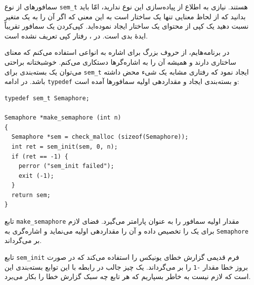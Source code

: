 \documentclass{book}
\begin{document}
    سمافورهای   از نوع {\tt sem\_t} هستند. نیازی به اطلاع از پیاده‌سازی این نوع ندارید، امّا باید بدانید که از لحاظ معنایی 
    تنها یک ساختار است به این معنی که اگر آن را به یک متغیر نسبت دهید یک کپی از محتوای یک ساختار ایجاد نموده‌اید. 
    کپی‌کردن یک سمافور تقریباً ایدهٔ بدی است. در ، رفتار کپی تعریف نشده است. 


    در برنامه‌هایم، از حروف بزرگ برای اشاره به انواعی  استفاده می‌کنم که معنای ساختاری دارند و همیشه آن را به اشاره‌گرها دستکاری می‌کنم. 
    خوشبختانه براحتی می‌توان یک بسته‌بندی برای  {\tt sem\_t} ایجاد نمود که رفتاری مشابه یک شیء‌ محض داشته باشد. 
    در ادامه {\tt typedef}  و بسته‌بندی ایجاد و مقداردهی اولیه سمافورها آمده است: 

\begin{latin}
\begin{lstlisting}
typedef sem_t Semaphore;

Semaphore *make_semaphore (int n)
{
  Semaphore *sem = check_malloc (sizeof(Semaphore));
  int ret = sem_init(sem, 0, n);
  if (ret == -1) {
    perror ("sem_init failed");
    exit (-1);    
  }
  return sem;
}
\end{lstlisting}
\end{latin}

    تابع {\tt make\_semaphore} مقدار اولیه سمافور را به عنوان پارامتر می‌گیرد. فضای لازم برای یک  را تخصیص داده و آن را 
    مقداردهی اولیه می‌نماید و اشاره‌گری به {\tt Semaphore} بر می‌گرداند. 

    تابع {\tt sem\_init} فرم قدیمی گزارش خطای یونیکس را استفاده می‌کند که در صورت بروز خطا مقدار {\tt -1} را بر می‌گرداند. یک چیز 
    جالب در رابطه با این توابع بسته‌بندی این است که لازم نیست به خاطر بسپاریم که هر تابع چه سبک گزارش خطا را بکار می‌برد. 
\end{document}
